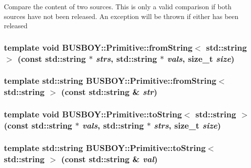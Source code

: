 Compare the content of two sources. This is only a valid comparison if both sources have not been released. An exception will be thrown if either has been released \hypertarget{namespaceBUSBOY_a07a2b3789d315b22647f060788aa72ab}{
\subsubsection[{Primitive::fromString$<$ std::string $>$}]{\setlength{\rightskip}{0pt plus 5cm}template void BUSBOY::Primitive::fromString$<$ std::string $>$ (const std::string $\ast$ {\em strs}, \/  std::string $\ast$ {\em vals}, \/  size\_\-t {\em size})}}
\label{namespaceBUSBOY_a07a2b3789d315b22647f060788aa72ab}
\hypertarget{namespaceBUSBOY_ae9cfd49649c24e5866a81067a2787906}{
\subsubsection[{Primitive::fromString$<$ std::string $>$}]{\setlength{\rightskip}{0pt plus 5cm}template std::string BUSBOY::Primitive::fromString$<$ std::string $>$ (const std::string \& {\em str})}}
\label{namespaceBUSBOY_ae9cfd49649c24e5866a81067a2787906}
\hypertarget{namespaceBUSBOY_aaf1c55f7460aa06870133ce02137c52c}{
\subsubsection[{Primitive::toString$<$ std::string $>$}]{\setlength{\rightskip}{0pt plus 5cm}template void BUSBOY::Primitive::toString$<$ std::string $>$ (const std::string $\ast$ {\em vals}, \/  std::string $\ast$ {\em strs}, \/  size\_\-t {\em size})}}
\label{namespaceBUSBOY_aaf1c55f7460aa06870133ce02137c52c}
\hypertarget{namespaceBUSBOY_a533d026b15dd61e6cecd58c893351a91}{
\subsubsection[{Primitive::toString$<$ std::string $>$}]{\setlength{\rightskip}{0pt plus 5cm}template std::string BUSBOY::Primitive::toString$<$ std::string $>$ (const std::string \& {\em val})}}
